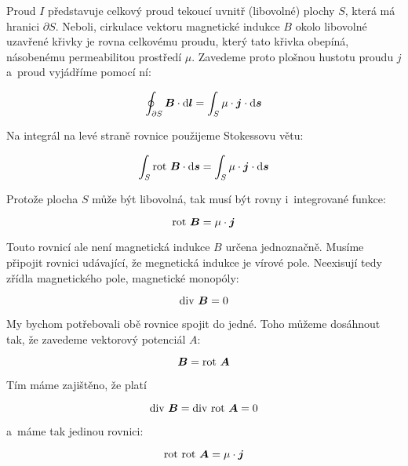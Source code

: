 Proud \(I\) představuje celkový proud tekoucí uvnitř (libovolné) plochy \(S\), která má hranici \(\partial S\). Neboli, cirkulace vektoru magnetické indukce \(B\) okolo libovolné uzavřené křivky je rovna celkovému proudu, který tato křivka obepíná, násobenému permeabilitou prostředí \(\mu\). Zavedeme proto plošnou hustotu proudu \(j\) a~proud vyjádříme pomocí ní:

\begin{equation}
\oint_{\partial S} \boldsymbol{B} \cdot \mathrm{d}\boldsymbol{l} = \int_S \mu \cdot \boldsymbol{j} \cdot \mathrm{d}\boldsymbol{s}
\end{equation}

Na integrál na levé straně rovnice použijeme Stokessovu větu:

\begin{equation}
\int_{S} \mathrm{rot} \ \boldsymbol{B} \cdot \mathrm{d}\boldsymbol{s} = \int_S \mu \cdot \boldsymbol{j} \cdot \mathrm{d}\boldsymbol{s}
\end{equation}

Protože plocha \(S\) může být libovolná, tak musí být rovny i~integrované funkce:

\begin{equation}
\mathrm{rot} \ \boldsymbol{B} = \mu \cdot \boldsymbol{j}
\end{equation}

Touto rovnicí ale není magnetická indukce \(B\) určena jednoznačně. Musíme připojit rovnici udávající, že megnetická indukce je vírové pole. Neexisují tedy zřídla magnetického pole, magnetické monopóly:

\begin{equation}
\mathrm{div} \ \boldsymbol{B} = 0
\end{equation}

My bychom potřebovali obě rovnice spojit do jedné. Toho můžeme dosáhnout tak, že zavedeme vektorový potenciál \(A\):

\begin{equation}
\boldsymbol{B} = \mathrm{rot} \ \boldsymbol{A}
\end{equation}

Tím máme zajištěno, že platí

\begin{equation}
\diverg \ \vect{B} = \diverg \ \rot \ \vect{A} = 0
\end{equation}

a~máme tak jedinou rovnici:

\begin{equation}
\mathrm{rot} \ \mathrm{rot} \ \boldsymbol{A} = \mu \cdot \boldsymbol{j}
\end{equation}

